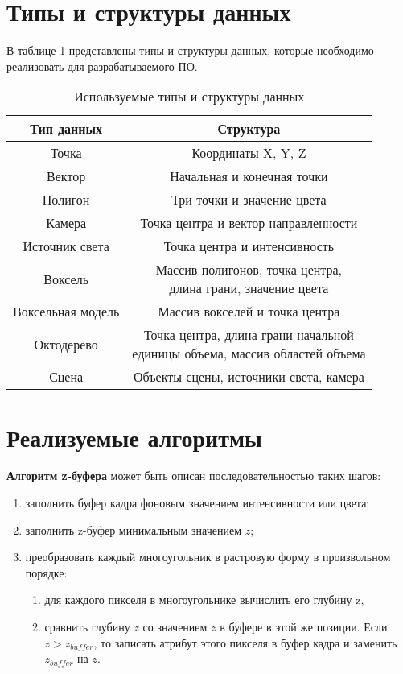\section{Типы и структуры данных}

В таблице \ref{types-table} представлены типы и структуры данных, которые необходимо реализовать для разрабатываемого ПО.

\begin{table}[h!]
	\begin{center}
		\caption{Используемые типы и структуры данных}
		\begin{tabular}{ |c|c| }
			\hline
			\textbf{Тип данных} & \textbf{Структура}\\ \hline
			Точка & Координаты X, Y, Z \\ \hline
			Вектор & Начальная и конечная точки \\ \hline
			Полигон & Три точки и значение цвета \\ \hline
			Камера & Точка центра и вектор направленности \\ \hline
			Источник света & Точка центра и интенсивность \\ \hline
			Воксель & \specialcell{Массив полигонов, точка центра, \\длина грани, значение цвета} \\ \hline
			Воксельная модель & Массив вокселей и точка центра \\ \hline
			Октодерево & \specialcell{Точка центра, длина грани начальной \\единицы объема, массив областей объема} \\ \hline
			Сцена & Объекты сцены, источники света, камера \\ \hline
		\end{tabular}
		\label{types-table}
	\end{center}
\end{table}	

\section{Реализуемые алгоритмы}
\textbf{Алгоритм z-буфера} может быть описан последователь­ностью таких шагов:
\begin{enumerate}
	\item заполнить буфер кадра фоновым значением интенсивности или цвета;
	\item заполнить z-буфер минимальным значением $z$;
	\item преобразовать каждый многоугольник в растровую форму в произ­вольном порядке:
	\begin{enumerate}
		\item для каждого пикселя в многоугольнике вычислить его глубину z,
		\item сравнить глубину $z$ со значением $z$ в буфере в этой же позиции. Если $z > z_{buffer}$, то записать атрибут этого пикселя в буфер кадра и заменить $z_{buffer}$ на $z$.
	\end{enumerate}
\end{enumerate}

